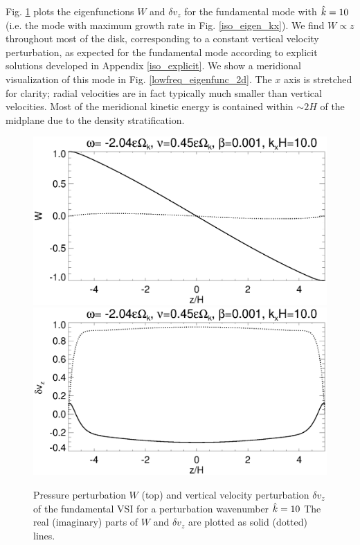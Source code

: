 Fig. \ref{lowfreq_eigenfunc} plots the eigenfunctions $W$ and $\delta 
v_z$ for the fundamental mode with $\hat{k}=10$ (i.e. the mode with
maximum growth rate in Fig. \ref{iso_eigen_kx}). We find $W\propto z$
throughout most of the disk, corresponding to a constant vertical
velocity perturbation, as expected for the fundamental mode according
to explicit solutions developed in Appendix \ref{iso_explicit}. We
show a meridional visualization of this mode in
Fig. \ref{lowfreq_eigenfunc_2d}. The $x$ axis is stretched for
clarity; radial velocities are in fact typically much
smaller than vertical velocities. Most of the meridional kinetic energy is
contained within $\sim 2H$ of the midplane due to the density 
stratification. 

\begin{figure}
  \includegraphics[width=\linewidth,clip=true,trim=0cm 1.75cm 0cm
  0cm]{figures/eigenvectorW_iso} 
  \includegraphics[width=\linewidth,clip=true,trim=0cm 0cm 0cm
  1cm]{figures/eigenvectorvz_iso}
  \caption{Pressure perturbation $W$ (top) and vertical velocity
    perturbation $\delta v_z$ of the fundamental VSI for a
    perturbation  wavenumber $\hat{k}=10$  The real 
    (imaginary) parts of $W$ and $\delta v_z$ are plotted as solid
    (dotted) lines. 
    \label{lowfreq_eigenfunc}
  }
\end{figure}


